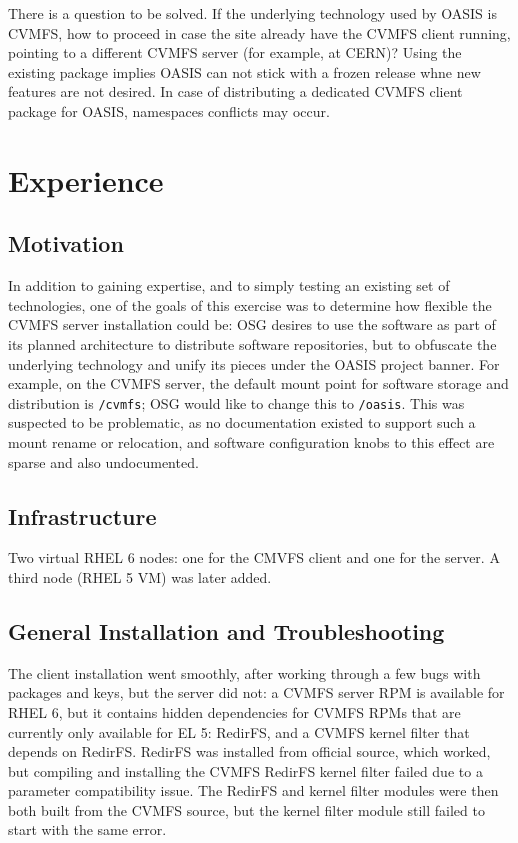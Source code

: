 \documentclass{article}
\renewcommand\appendix{\par
  \setcounter{section}{0}
  \setcounter{subsection}{0}
  \setcounter{figure}{0}
  \setcounter{table}{0}
  \renewcommand\thesection{Appendix \Alph{section}}
  \renewcommand\thefigure{\Alph{section}\arabic{figure}}
  \renewcommand\thetable{\Alph{section}\arabic{table}}
}
\begin{document}
There is a question to be solved. If the underlying technology used by OASIS is CVMFS,
how to proceed in case the site already have the CVMFS client running, pointing to a different CVMFS server (for example, at CERN)?
Using the existing package implies OASIS can not stick with a frozen release whne new features are not desired. 
In case of distributing a dedicated CVMFS client package for OASIS, namespaces conflicts may occur.

\newpage
\appendix


\section{Experience}

\subsection{Motivation}

In addition to gaining expertise, and to simply testing an existing set of technologies, 
one of the goals of this exercise was to determine how flexible the CVMFS server installation could be: 
OSG desires to use the software as part of its planned architecture to distribute software repositories, 
but to obfuscate the underlying technology and unify its pieces under the OASIS project banner.  
For example, on the CVMFS server, the default mount point for software storage and distribution is \verb+/cvmfs+; 
OSG would like to change this to \verb+/oasis+.  
This was suspected to be problematic, as no documentation existed to support such a mount rename or relocation, 
and software configuration knobs to this effect are sparse and also undocumented.  

\subsection{Infrastructure}

Two virtual RHEL 6 nodes: one for the CMVFS client and one for the server.
A third node (RHEL 5 VM) was later added. 

\subsection{General Installation and Troubleshooting} 

The client installation went smoothly, 
after working through a few bugs with packages and keys, 
but the server did not: a CVMFS server RPM is available for RHEL 6, 
but it contains hidden dependencies for CVMFS RPMs that are currently only available for EL 5: 
RedirFS, and a CVMFS kernel filter that depends on RedirFS.  
RedirFS was installed from official source, which worked, 
but compiling and installing the CVMFS RedirFS kernel filter failed due to a parameter compatibility issue.  
The RedirFS and kernel filter modules were then both built from the CVMFS source, 
but the kernel filter module still failed to start with the same error.  
\end{document}

